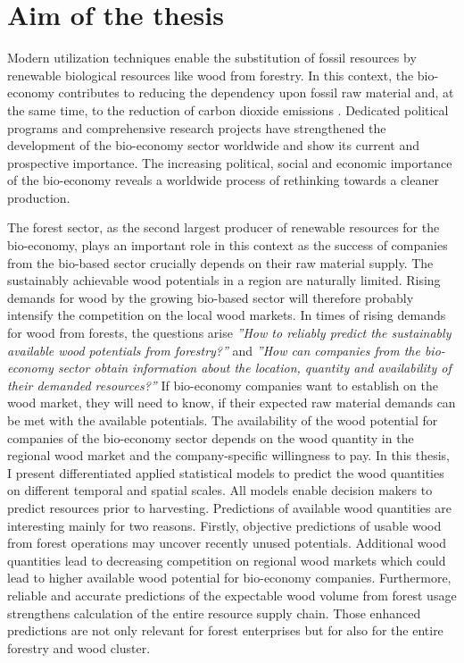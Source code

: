 \section{Aim of the thesis}
\label{sec:intro:aim}
Modern utilization techniques enable the substitution of fossil resources by renewable biological resources like wood from forestry. In this context, the bio-economy contributes to reducing the dependency upon fossil raw material and, at the same time, to the reduction of carbon dioxide emissions \citep[p. 4]{ingrao_2016}. Dedicated political programs and comprehensive research projects have strengthened the development of the bio-economy sector worldwide and show its current and prospective importance. The increasing political, social and economic importance of the bio-economy \citep[e.g.][p. 15-16]{bmel_2014b} reveals a worldwide process of rethinking towards a cleaner production.

The forest sector, as the second largest producer of renewable resources for the bio-economy, plays an important role in this context as the success of companies from the bio-based sector crucially depends on their raw material supply. The sustainably achievable wood potentials in a region are naturally limited. Rising demands for wood by the growing bio-based sector will therefore probably intensify the competition on the local wood markets. In times of rising demands for wood from forests, the questions arise \textit{''How to reliably predict the sustainably available wood potentials from forestry?''} and \textit{''How can companies from the bio-economy sector obtain information about the location, quantity and availability of their demanded resources?''} If bio-economy companies want to establish on the wood market, they will need to know, if their expected raw material demands can be met with the available potentials. The availability of the wood potential for companies of the bio-economy sector depends on the wood quantity in the regional wood market and the company-specific willingness to pay. In this thesis, I present differentiated applied statistical models to predict the wood quantities on different temporal and spatial scales. All models enable decision makers to predict resources prior to harvesting. Predictions of available wood quantities are interesting mainly for two reasons. Firstly, objective predictions of usable wood from forest operations may uncover recently unused potentials. Additional wood quantities lead to decreasing competition on regional wood markets which could lead to higher available wood potential for bio-economy companies. Furthermore, reliable and accurate predictions of the expectable wood volume from forest usage strengthens calculation of the entire resource supply chain. Those enhanced predictions are not only relevant for forest enterprises but for also for the entire forestry and wood cluster.
	
